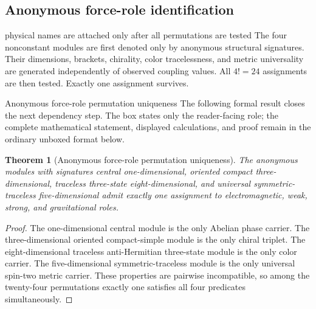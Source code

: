 \documentclass[11pt]{article}
\numberwithin{equation}{section}
\newtheorem{theorem}[definition]{Theorem}
\theoremstyle{remark}
\begin{document}
\subsection{Anonymous force-role identification}
\begin{conceptledger}{physical names are attached only after all permutations are tested}
The four nonconstant modules are first denoted only by anonymous structural signatures. Their dimensions, brackets, chirality, color tracelessness, and metric universality are generated independently of observed coupling values. All $4!=24$ assignments are then tested. Exactly one assignment survives.
\end{conceptledger}
\begin{proofguide}{Anonymous force-role permutation uniqueness}
The following formal result closes the next dependency step. The box states only the reader-facing role; the complete mathematical statement, displayed calculations, and proof remain in the ordinary unboxed format below.
\end{proofguide}
\begin{theorem}[Anonymous force-role permutation uniqueness]
The anonymous modules with signatures central one-dimensional, oriented compact three-dimensional, traceless three-state eight-dimensional, and universal symmetric-traceless five-dimensional admit exactly one assignment to electromagnetic, weak, strong, and gravitational roles.
\end{theorem}
\begin{proof}
The one-dimensional central module is the only Abelian phase carrier. The three-dimensional oriented compact-simple module is the only chiral triplet. The eight-dimensional traceless anti-Hermitian three-state module is the only color carrier. The five-dimensional symmetric-traceless module is the only universal spin-two metric carrier. These properties are pairwise incompatible, so among the twenty-four permutations exactly one satisfies all four predicates simultaneously.
\end{proof}
\end{document}
